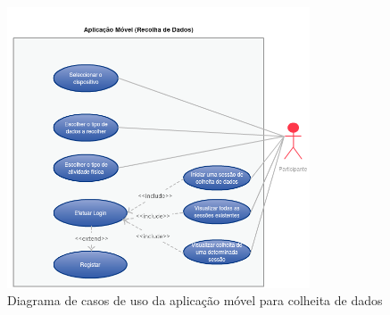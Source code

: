 \begin{figure}[H]
  \centering
  \includegraphics[width=0.8\textwidth]{imgs/app-and-usecase.png}
  \caption[Diagrama de casos de uso da aplicação móvel para colheita de dados]{Diagrama de casos de uso da aplicação móvel para colheita de dados}
  
  \label{f:usecaseandroidapp}
\end{figure}

\newpage


